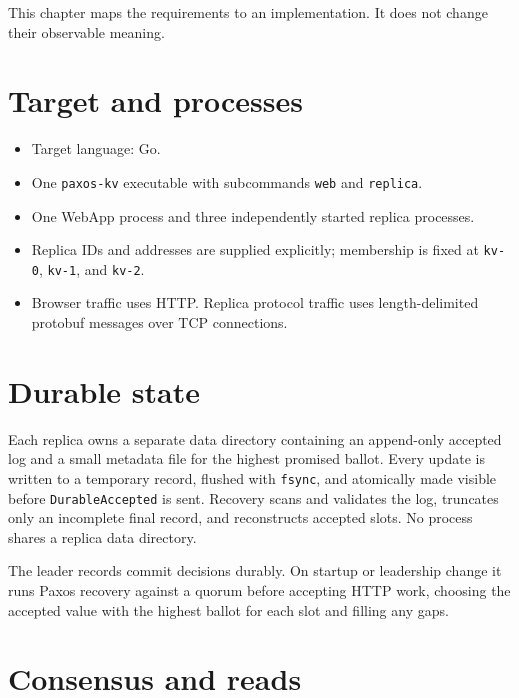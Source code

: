 This chapter maps the requirements to an implementation. It does not
change their observable meaning.


\hypertarget{target-and-processes}{%
\section{Target and processes}\label{target-and-processes}}

\begin{itemize}
\tightlist
\item
  Target language: Go.
\item
  One \texttt{paxos-kv} executable with subcommands \texttt{web} and
  \texttt{replica}.
\item
  One WebApp process and three independently started replica processes.
\item
  Replica IDs and addresses are supplied explicitly; membership is fixed
  at \texttt{kv-0}, \texttt{kv-1}, and \texttt{kv-2}.
\item
  Browser traffic uses HTTP. Replica protocol traffic uses
  length-delimited protobuf messages over TCP connections.
\end{itemize}

\hypertarget{durable-state}{%
\section{Durable state}\label{durable-state}}

Each replica owns a separate data directory containing an append-only
accepted log and a small metadata file for the highest promised ballot.
Every update is written to a temporary record, flushed with
\texttt{fsync}, and atomically made visible before
\texttt{DurableAccepted} is sent. Recovery scans and validates the log,
truncates only an incomplete final record, and reconstructs accepted
slots. No process shares a replica data directory.

The leader records commit decisions durably. On startup or leadership
change it runs Paxos recovery against a quorum before accepting HTTP
work, choosing the accepted value with the highest ballot for each slot
and filling any gaps.

\hypertarget{consensus-and-reads}{%
\section{Consensus and reads}\label{consensus-and-reads}}


